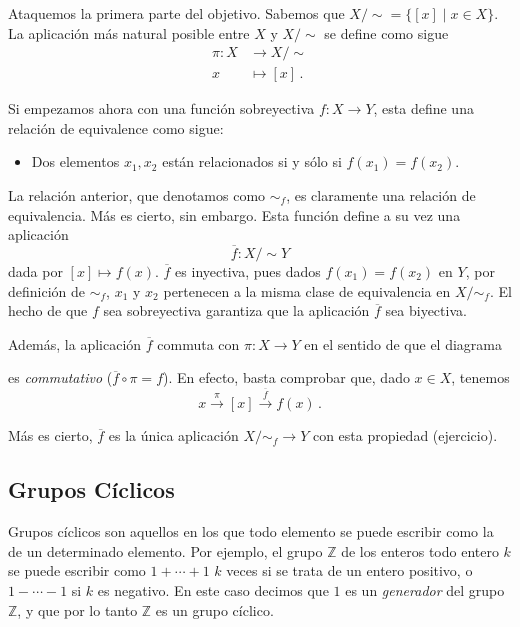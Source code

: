 \documentclass[a4paper,11pt]{amsart}
\theoremstyle{plain}
\theoremstyle{definition}
\theoremstyle{remark}
\begin{document}
Ataquemos la primera parte del objetivo. Sabemos que $X/\sim = \{ [x] \mid x \in X\}$. La aplicación más natural posible entre $X$ y $X/\sim$ se define como sigue 
\begin{align*}
    \pi \colon X & \to X/\sim \\
    x & \mapsto [x] \, .
\end{align*}


Si empezamos ahora con una función sobreyectiva $f \colon X \to Y$, esta define una relación de equivalence como sigue:
\begin{itemize}
    \item Dos elementos $x_1, x_2$ están relacionados si y sólo si $f(x_1) = f(x_2)$.
\end{itemize}
La relación anterior, que denotamos como $\sim_f$, es claramente una relación de equivalencia. Más es cierto, sin embargo. Esta función define a su vez una aplicación 
\[ \overline{f} \colon X/\sim Y\]
dada por $[x] \mapsto f(x)$. $\overline{f}$ es inyectiva, pues dados $f(x_1) = f(x_2)$ en $Y$, por definición de $\sim_f$, $x_1$ y $x_2$ pertenecen a la misma clase de equivalencia en $X/\sim_f$. El hecho de que $f$ sea sobreyectiva garantiza que la aplicación $\overline{f}$ sea biyectiva. 

Además, la aplicación $\overline{f}$ commuta con $\pi \colon X \to Y$ en el sentido de que el diagrama 
\begin{center}
\end{center}
es \textit{commutativo} ($\overline{f} \circ \pi = f$). En efecto, basta comprobar que, dado $x \in X$, tenemos 
\[x \xrightarrow{\pi} [x] \xrightarrow{\overline{f}} f(x)  \, .\]

Más es cierto, $\overline{f}$ es la única aplicación $X/\sim_f \to Y$ con esta propiedad (ejercicio). 

\subsection{Grupos Cíclicos}


Grupos cíclicos son aquellos en los que todo elemento se puede escribir como la  de un determinado elemento. Por ejemplo, el grupo $\mathbb{Z}$ de los enteros todo entero $k$ se puede escribir como $1 + \cdots + 1$ $k$ veces si se trata de un entero positivo, o $1 - \cdots - 1$ si $k$ es negativo. En este caso decimos que $1$ es un \textit{generador} del grupo $\mathbb{Z}$, y que por lo tanto $\mathbb{Z}$ es un grupo cíclico. 
\end{document}
